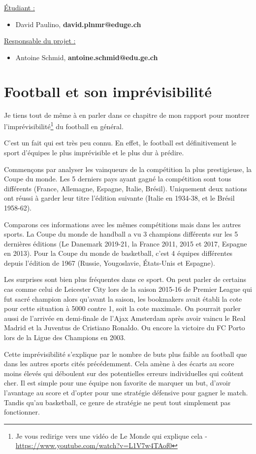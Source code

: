 \documentclass[a4paper,14pt]{extarticle}
\begin{document}
{{\underline{Étudiant :}}
\begin{itemize}
    \item David Paulino, \textbf{david.plnmr@eduge.ch}
\end{itemize}
 {\underline{Responsable du projet :}}
\begin{itemize}
    \item Antoine Schmid, \textbf{antoine.schmid@edu.ge.ch}
\end{itemize}

\section{Football et son imprévisibilité}

Je tiens tout de même à en parler dans ce chapitre de mon rapport pour montrer l'imprévisibilité\footnote{Je vous redirige vers une vidéo de Le Monde qui explique cela - \url{https://www.youtube.com/watch?v=L1V7w4TAof0}} du football en général. 

C'est un fait qui est très peu connu. En effet, le football est définitivement le sport d'équipes le plus imprévisible et le plus dur à prédire. 

Commençons par analyser les vainqueurs de la compétition la plus prestigieuse, la Coupe du monde. Les 5 derniers pays ayant gagné la compétition sont tous différents (France, Allemagne, Espagne, Italie, Brésil). Uniquement deux nations ont réussi à garder leur titre l'édition suivante (Italie en 1934-38, et le Brésil 1958-62). 

Comparons ces informations avec les mêmes compétitions mais dans les autres sports. La Coupe du monde de handball a vu 3 champions différents sur les 5 dernières éditions (Le Danemark 2019-21, la France 2011, 2015 et 2017, Espagne en 2013). Pour la Coupe du monde de basketball, c'est 4 équipes différentes depuis l'édition de 1967 (Russie, Yougoslavie, États-Unis et Espagne). 

Les surprises sont bien plus fréquentes dans ce sport. On peut parler de certains cas comme celui de Leicester City lors de la saison 2015-16 de Premier League qui fut sacré champion alors qu'avant la saison, les bookmakers avait établi la cote pour cette situation à 5000 contre 1, soit la cote maximale. On pourrait parler aussi de l'arrivée en demi-finale de l'Ajax Amsterdam après avoir vaincu le Real Madrid et la Juventus de Cristiano Ronaldo. Ou encore la victoire du FC Porto lors de la Ligue des Champions en 2003.

Cette imprévisibilité s'explique par le nombre de buts plus faible au football que dans les autres sports cités précédemment. Cela amène à des écarts au score moins élevés qui déboulent sur des potentielles erreurs individuelles qui coûtent cher. Il est simple pour une équipe non favorite de marquer un but, d'avoir l'avantage au score et d'opter pour une stratégie défensive pour gagner le match. Tandis qu'au basketball, ce genre de stratégie ne peut tout simplement pas fonctionner.

}
\end{document}
